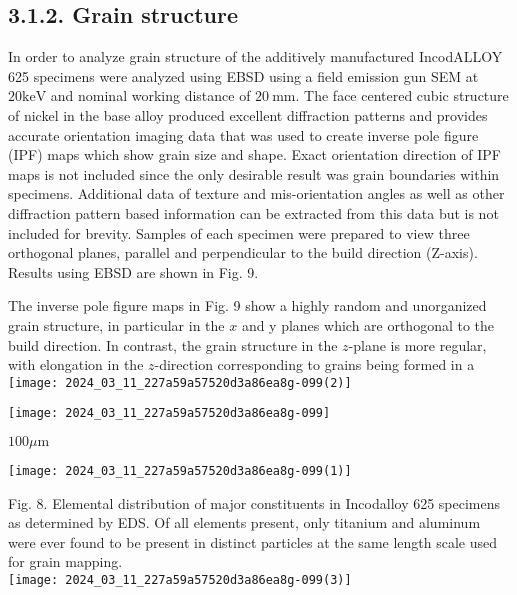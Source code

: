 \documentclass[10pt]{article}
\begin{document}
\subsection*{3.1.2. Grain structure}
In order to analyze grain structure of the additively manufactured IncodALLOY 625 specimens were analyzed using EBSD using a field emission gun SEM at $20 \mathrm{keV}$ and nominal working distance of $20 \mathrm{~mm}$. The face centered cubic structure of nickel in the base alloy produced excellent diffraction patterns and provides accurate orientation imaging data that was used to create inverse pole figure (IPF) maps which show grain size and shape. Exact orientation direction of IPF maps is not included since the only desirable result was grain boundaries within specimens. Additional data of texture and mis-orientation angles as well as other diffraction pattern based information can be extracted from this data but is not included for brevity. Samples of each specimen were prepared to view three orthogonal planes, parallel and perpendicular to the build direction (Z-axis). Results using EBSD are shown in Fig. 9.

The inverse pole figure maps in Fig. 9 show a highly random and unorganized grain structure, in particular in the $x$ and y planes which are orthogonal to the build direction. In contrast, the grain structure in the $z$-plane is more regular, with elongation in the $z$-direction corresponding to grains being formed in a\\
\texttt{[image: 2024\_03\_11\_227a59a57520d3a86ea8g-099(2)]}

\begin{center}
\texttt{[image: 2024\_03\_11\_227a59a57520d3a86ea8g-099]}
\end{center}

$100 \mu \mathrm{m}$

\begin{center}
\texttt{[image: 2024\_03\_11\_227a59a57520d3a86ea8g-099(1)]}
\end{center}

Fig. 8. Elemental distribution of major constituents in Incodalloy 625 specimens as determined by EDS. Of all elements present, only titanium and aluminum were ever found to be present in distinct particles at the same length scale used for grain mapping.\\
\texttt{[image: 2024\_03\_11\_227a59a57520d3a86ea8g-099(3)]}
\end{document}
